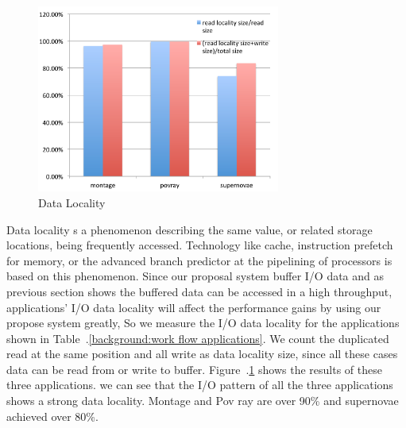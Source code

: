 \begin{figure}
\centering
\includegraphics[width=8cm]{img/data_locality.pdf}
\caption{Data Locality}
\label{background:data locality}
\end{figure}

Data locality s a phenomenon describing the same value, or related storage locations, being
frequently accessed.
Technology like cache, instruction prefetch for memory, or the advanced branch predictor
at the pipelining of processors is based on this phenomenon.
Since our proposal system buffer I/O data and as previous section shows the buffered data can be
accessed in a high throughput, applications' I/O data locality will affect the performance gains by
using our propose system greatly, So we measure the I/O data locality for the applications shown in
Table~.\ref{background:work flow applications}.
We count the duplicated read at the same position and all write as data locality size, since all
these cases data can be read from or write to buffer.
Figure~.\ref{background:data locality} shows the results of these three applications. we can see
that the I/O pattern of all the three applications shows a strong data locality. Montage and Pov ray
are over 90\% and supernovae achieved over 80\%.

